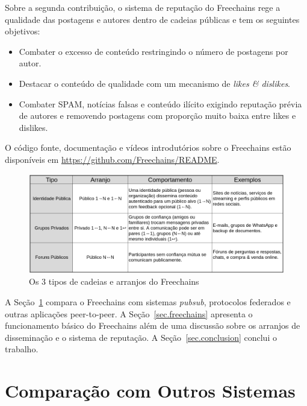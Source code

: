 \documentclass[12pt]{article}
\newcommand{\FC} {Freechains\xspace}
\begin{document}
%
Sobre a segunda contribuição, o sistema de reputação do \FC rege a qualidade
das postagens e autores dentro de cadeias públicas e tem os seguintes
objetivos:
%
\begin{itemize}
\item Combater o excesso de conteúdo restringindo o número de postagens por autor.
\item Destacar o conteúdo de qualidade com um mecanismo de \emph{likes \& dislikes}.
\item Combater SPAM, notícias falsas e conteúdo ilícito exigindo reputação
      prévia de autores e removendo postagens com proporção muito baixa entre
      likes e dislikes.
\end{itemize}
%
O código fonte, documentação e vídeos introdutórios sobre o \FC estão
disponíveis em \url{https://github.com/Freechains/README}.

\begin{figure}[ht]
\centering
\includegraphics[width=\textwidth]{arranjos.png}
%
%
\caption{Os 3 tipos de cadeias e arranjos do \FC}
\label{fig.table}
\end{figure}

A Seção~\ref{sec.related} compara o \FC com sistemas \emph{pubsub}, protocolos
federados e outras aplicações peer-to-peer.
A Seção~\ref{sec.freechains} apresenta o funcionamento básico do \FC além de
uma discussão sobre os arranjos de disseminação e o sistema de reputação.
A Seção~\ref{sec.conclusion} conclui o trabalho.

\section{Comparação com Outros Sistemas}
\label{sec.related}
\end{document}
